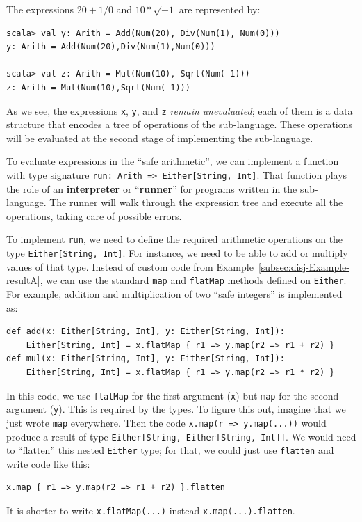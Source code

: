 The expressions $20+1/0$ and $10*\sqrt{-1}$ are represented by:
\begin{lstlisting}
scala> val y: Arith = Add(Num(20), Div(Num(1), Num(0)))
y: Arith = Add(Num(20),Div(Num(1),Num(0)))

scala> val z: Arith = Mul(Num(10), Sqrt(Num(-1)))
z: Arith = Mul(Num(10),Sqrt(Num(-1)))
\end{lstlisting}
As we see, the expressions \lstinline!x!, \lstinline!y!, and \lstinline!z!
\emph{remain} \emph{unevaluated}; each of them is a data structure
that encodes a tree of operations of the sub-language. These operations
will be evaluated at the second stage of implementing the sub-language.

To evaluate expressions in the \textsf{``}safe arithmetic\textsf{''}, we can implement
a function with type signature \lstinline!run: Arith => Either[String, Int]!.
That function plays the role of an \textbf{interpreter}
or \textsf{``}\textbf{runner}\textsf{''} for programs written in the
sub-language. The runner will walk through the expression tree and
execute all the operations, taking care of possible errors. 

To implement \lstinline!run!, we need to define the required arithmetic
operations on the type \lstinline!Either[String, Int]!. For instance,
we need to be able to add or multiply values of that type. Instead
of custom code from Example~\ref{subsec:disj-Example-resultA}, we
can use the standard \lstinline!map! and \lstinline!flatMap! methods
defined on \lstinline!Either!. For example, addition and multiplication
of two \textsf{``}safe integers\textsf{''} is implemented as:
\begin{lstlisting}
def add(x: Either[String, Int], y: Either[String, Int]):
    Either[String, Int] = x.flatMap { r1 => y.map(r2 => r1 + r2) }
def mul(x: Either[String, Int], y: Either[String, Int]):
    Either[String, Int] = x.flatMap { r1 => y.map(r2 => r1 * r2) }
\end{lstlisting}
In this code, we use \lstinline!flatMap! for the first argument (\lstinline!x!)
but \lstinline!map! for the second argument (\lstinline!y!). This
is required by the types. To figure this out, imagine that we just
wrote \lstinline!map! everywhere. Then the code \lstinline!x.map(r => y.map(...))!
would produce a result of type \lstinline!Either[String, Either[String, Int]]!.
We would need to \textsf{``}flatten\textsf{''} this nested \lstinline!Either! type;
for that, we could just use \lstinline!flatten! and write code like
this:
\begin{lstlisting}
x.map { r1 => y.map(r2 => r1 + r2) }.flatten
\end{lstlisting}
It is shorter to write \lstinline!x.flatMap(...)! instead \lstinline!x.map(...).flatten!.


